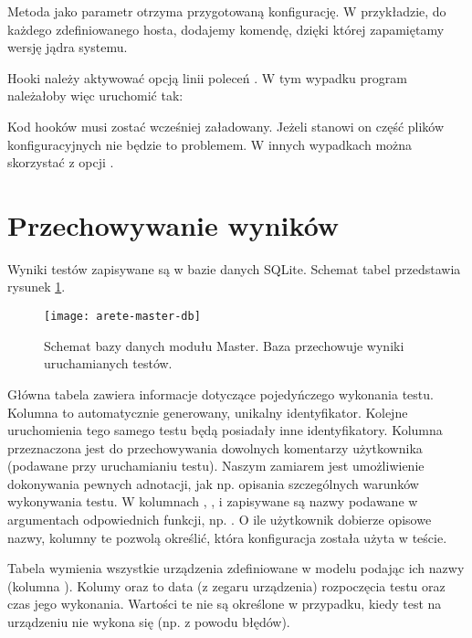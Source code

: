 \documentclass[00-praca-magisterska.tex]{subfiles}
\begin{document}
Metoda  jako parametr otrzyma przygotowaną
konfigurację. W przykładzie, do każdego zdefiniowanego hosta, dodajemy komendę,
dzięki której zapamiętamy wersję jądra systemu.

Hooki należy aktywować opcją linii poleceń . W tym wypadku
program należałoby więc uruchomić tak:

\begin{textcode}
\end{textcode}

Kod hooków musi zostać wcześniej załadowany. Jeżeli stanowi on część plików
konfiguracyjnych nie będzie to problemem. W innych wypadkach można skorzystać z
opcji .

\section{Przechowywanie wyników}

Wyniki testów zapisywane są w bazie danych SQLite. Schemat tabel przedstawia
rysunek \ref{fig:arete-master-db}.

\begin{figure}[htb]
\begin{center}
\leavevmode
\texttt{[image: arete-master-db]}
\end{center}
\caption{Schemat bazy danych modułu Master. Baza przechowuje wyniki
uruchamianych testów.}
\label{fig:arete-master-db}
\end{figure}

Główna tabela  zawiera informacje dotyczące pojedyńczego wykonania
testu. Kolumna  to automatycznie generowany, unikalny identyfikator.
Kolejne uruchomienia tego samego testu będą posiadały inne identyfikatory.
Kolumna  przeznaczona jest do przechowywania dowolnych komentarzy
użytkownika (podawane przy uruchamianiu testu). Naszym zamiarem jest
umożliwienie dokonywania pewnych adnotacji, jak np. opisania szczególnych
warunków wykonywania testu. W kolumnach , ,
 i  zapisywane są nazwy podawane w argumentach
odpowiednich funkcji, np. . O ile użytkownik
dobierze opisowe nazwy, kolumny te pozwolą określić, która konfiguracja została
użyta w teście.

Tabela  wymienia wszystkie urządzenia zdefiniowane w modelu podając
ich nazwy (kolumna ). Kolumy  oraz 
to data (z zegaru urządzenia) rozpoczęcia testu oraz czas jego wykonania.
Wartości te nie są określone w przypadku, kiedy test na urządzeniu nie wykona
się (np. z powodu błędów).
\end{document}
